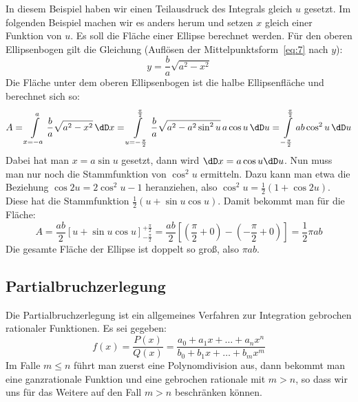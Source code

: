 In diesem Beispiel haben wir einen Teilausdruck des Integrals gleich $u$
gesetzt. Im folgenden Beispiel machen wir es anders herum und setzen $x$
gleich einer Funktion von $u$. Es soll die Fläche einer Ellipse berechnet
werden. Für den oberen Ellipsenbogen gilt die Gleichung (Auflösen der
Mittelpunktsform~\eqref{eq:7} nach $y$):
\[
y=\frac{b}{a}\sqrt{a^2-x^2}
\]
Die Fläche unter dem oberen Ellipsenbogen ist die halbe Ellipsenfläche und
berechnet sich so:
\[
A=\int\limits_{x=-a}^a \frac{b}{a}\sqrt{a^2-x^2}\,\dD x=
\int\limits_{u=-\frac{\pi}{2}}^{\frac{\pi}{2}}
\frac{b}{a}\sqrt{a^2-a^2\sin^2u}\,a\cos u\,\dD u=
\int\limits_{-\frac{\pi}{2}}^{\frac{\pi}{2}}ab\cos^2u\,\dD u
\]
Dabei hat man $x=a\sin u$ gesetzt, dann wird $\dD x=a\cos u \dD u$. Nun muss
man nur noch die Stammfunktion von $\cos^2u$ ermitteln. Dazu kann man etwa die
Beziehung $\cos2u=2\cos^2u-1$ heranziehen, also
$\cos^2u=\frac{1}{2}(1+\cos2u)$. Diese hat die Stammfunktion
$\frac{1}{2}(u+\sin u\cos u)$. Damit bekommt man für die Fläche:
\[
A=\frac{ab}{2}\left[u+\sin u\cos u\right]_{-\frac{\pi}{2}}^{+\frac{\pi}{2}}=
\frac{ab}{2}[(\frac{\pi}{2}+0)-(-\frac{\pi}{2}+0)]=\frac{1}{2}\pi a b
\]
Die gesamte Fläche der Ellipse ist doppelt so groß, also $\pi a b$.

\subsection{Partialbruchzerlegung}
Die Partialbruchzerlegung ist ein allgemeines Verfahren zur Integration
gebrochen rationaler Funktionen. Es sei gegeben:
\begin{equation}
  \label{eq:68}
  f(x)=\frac{P(x)}{Q(x)}
  =\frac{a_0+a_1x+\dots+a_nx^n}{b_0+b_1x+\dots+b_mx^m}
\end{equation}
Im Falle $m\le n$ führt man zuerst eine Polynomdivision aus, dann bekommt man
eine ganzrationale Funktion und eine gebrochen rationale mit $m>n$, so dass
wir uns für das Weitere auf den Fall $m>n$ beschränken können.

